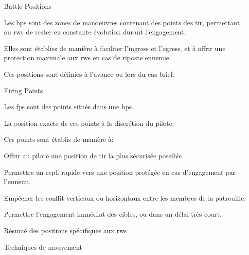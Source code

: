 	\item Battle Positions

	\e
	    \item Les \glspl{bp} sont des zones de manoeuvres contenant des points des tir, permettant au \glspl{rw} de rester en constante évolution durant l'engagement.
	    \item Elles sont établies de manière à faciliter l'ingress et l'egress, et à offrir une protection maximale aux \glspl{rw} en cas de riposte ennemie.
	    \item Ces positions sont définies à l'avance ou lors du \gls{cas} brief.
	\ed

	\item Firing Points

	\e
	    \item Les \glspl{fp} sont des points situés dans une \glspl{bp}.
	    \item La position exacte de ces points à la discrétion du pilote.
	    \item Ces points sont établis de manière à:
	    \ee
	        \item Offrir au pilote une position de tir la plus sécurisée possible
	        \item Permettre un repli rapide vers une position protégée en cas d'engagement par l'ennemi.
	        \item Empêcher les conflit verticaux ou horizontaux entre les membres de la patrouille.
	        \item Permettre l'engagement immédiat des cibles, ou dans un délai très court.
	    \ed
	\ed
	\item Résumé des positions spécifiques aux \glspl{rw}

	\item Techniques de mouvement

